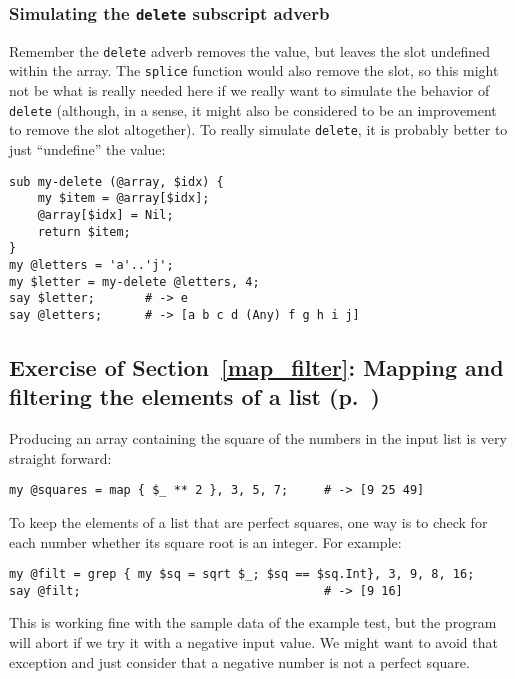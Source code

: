 {\subsubsection{Simulating the {\tt delete} subscript adverb}

Remember the {\tt delete} adverb removes the value, but 
leaves the slot undefined within the array. The {\tt splice} 
function would also remove the slot, so this might not be 
what is really needed here if we really want to simulate the 
behavior of {\tt delete} (although, in a sense, it might 
also be considered to be an improvement to remove the slot
altogether). To really simulate {\tt delete}, it is probably 
better to just ``undefine'' the value:

\begin{verbatim}
sub my-delete (@array, $idx) {
    my $item = @array[$idx];
    @array[$idx] = Nil;
    return $item;
}
my @letters = 'a'..'j';
my $letter = my-delete @letters, 4;
say $letter;       # -> e
say @letters;      # -> [a b c d (Any) f g h i j]
\end{verbatim}

\subsection{Exercise of Section~\ref{map_filter}: Mapping and filtering the elements of a list (p.~\pageref{exercise_squares})}
\label{sol_exercise_squares}

Producing an array containing the square of the numbers in the input list is very straight forward:

\begin{verbatim}
my @squares = map { $_ ** 2 }, 3, 5, 7;     # -> [9 25 49]
\end{verbatim}
%

To keep the elements of a list that are perfect squares, one 
way is to check for each number whether its square root 
is an integer. For example:

\begin{verbatim}
my @filt = grep { my $sq = sqrt $_; $sq == $sq.Int}, 3, 9, 8, 16;
say @filt;                                  # -> [9 16]
\end{verbatim}
%

This is working fine with the sample data of the example test, 
but the program will abort if we try it with a negative input 
value. We might want to avoid that exception and just 
consider that a negative number is not a perfect square.

}

